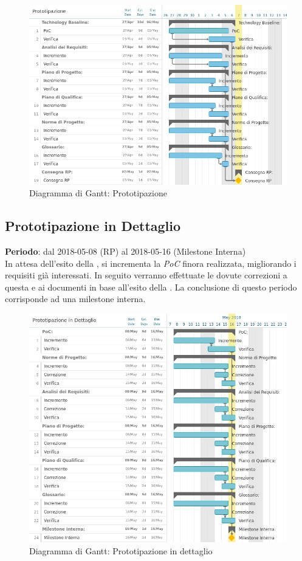 \begin{figure}[h!]
	\centerline{\includegraphics[scale=0.55]{img/DiagrammiGantt/Prototipazione.jpg}}
	\caption{Diagramma di Gantt: Prototipazione}
	\label{fig:gantt_prot}
\end{figure}
\clearpage

\subsection{Prototipazione in Dettaglio}
\textbf{Periodo}: dal 2018-05-08 (RP) al 2018-05-16 (Milestone Interna)\\

In attesa dell'esito della \RP{}, si incrementa la \emph{PoC} finora realizzata, migliorando i requisiti già interessati. In seguito verranno effettuate le dovute correzioni a questa e ai documenti in base all'esito della \RP{}. La conclusione di questo periodo corrisponde ad una milestone interna.

\begin{figure}[h!]
	\centerline{\includegraphics[scale=0.55]{img/DiagrammiGantt/PrototipazioneDettaglio.jpg}}
	\caption{Diagramma di Gantt: Prototipazione in dettaglio}
	\label{fig:gantt_prot_dett}
\end{figure}
\clearpage

